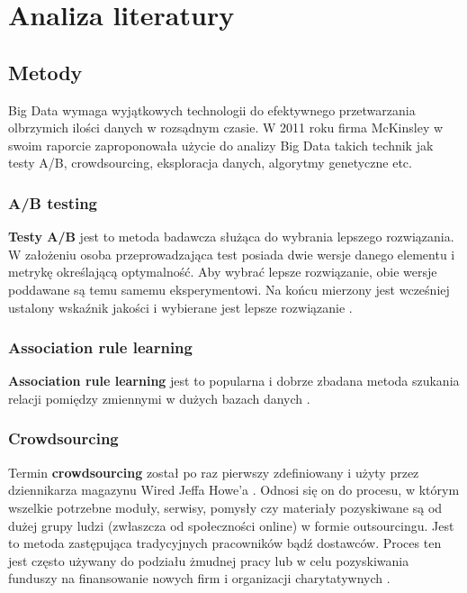 \section{Analiza literatury}
\label{sec:analiza_literatury}

\subsection{Metody}
\label{sub:metody}
Big Data wymaga wyjątkowych technologii do efektywnego przetwarzania olbrzymich ilości danych w rozsądnym czasie. W 2011 roku firma {McKinsley} w swoim raporcie \cite{McKinsey2011} zaproponowała użycie do analizy Big Data takich technik jak testy A/B, crowdsourcing, eksploracja danych, algorytmy genetyczne etc.

\subsubsection{A/B testing}
\label{sub:a/b_testing}
\textbf{Testy A/B} jest to metoda badawcza służąca do wybrania lepszego rozwiązania. W założeniu osoba przeprowadzająca test posiada dwie wersje danego elementu i metrykę określającą optymalność. Aby wybrać lepsze rozwiązanie, obie wersje poddawane są temu samemu eksperymentowi. Na końcu mierzony jest wcześniej ustalony wskaźnik jakości i wybierane jest lepsze rozwiązanie \cite{paras10}.

\subsubsection{Association rule learning}
\label{sub:association_rule_learning}
\textbf{Association rule learning} jest to popularna i dobrze zbadana metoda szukania relacji pomiędzy zmiennymi w dużych bazach danych \cite{tan2005introduction}.

\subsubsection{Crowdsourcing}
\label{sub:crowdsourcing}
Termin \textbf{crowdsourcing} został po raz pierwszy zdefiniowany i użyty przez dziennikarza magazynu Wired Jeffa Howe’a \cite{Howe2006}. Odnosi się on do procesu, w którym wszelkie potrzebne moduły, serwisy, pomysły czy materiały pozyskiwane są od dużej grupy ludzi (zwłaszcza od społeczności online) w formie outsourcingu. Jest to metoda zastępująca tradycyjnych pracowników bądź dostawców. Proces ten jest często używany do podziału żmudnej pracy lub w celu pozyskiwania funduszy na finansowanie nowych firm i organizacji charytatywnych \cite{Howe2006}.

